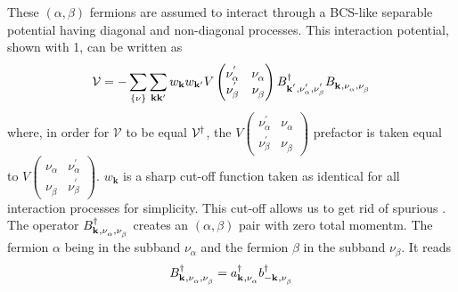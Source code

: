 \documentclass[11pt]{article} %
\begin{document}
These $(\alpha,\beta)$ fermions are assumed to interact through a BCS-like separable potential having diagonal and non-diagonal processes.  This interaction potential, shown with 1, can be written as 
\begin{equation}\label{eq:V}
\mathcal{V}=-\sum_{\{\nu\}}\sum_{\mathbf{k}\mathbf{k}'}w_{\mathbf{k}}w_{\mathbf{k}'}V 
\begin{pmatrix}
\nu_{\alpha}^{'}&\nu_{\alpha}^{}\\
\nu_{\beta}^{'}&\nu_{\beta}^{}
\end{pmatrix}
B^{\dagger}_{\mathbf{k}^{'},\nu_{\alpha}^{'},\nu_{\beta}^{'}}
B^{}_{\mathbf{k}^{ },\nu_{\alpha}^{},\nu_{\beta}^{}}
\end{equation}
where, in order for $\mathcal{V}$ to be equal  $\mathcal{V}^{\dagger}$, the $V 
\left(\begin{smallmatrix}
\nu_{\alpha}^{'}&\nu_{\alpha}^{}\\
\nu_{\beta}^{'}&\nu_{\beta}^{}
\end{smallmatrix}\right)$ prefactor is taken equal to $V 
\left(\begin{smallmatrix}
\nu_{\alpha}^{}&\nu_{\alpha}^{'}\\
\nu_{\beta}^{}&\nu_{\beta}^{'}
\end{smallmatrix}\right)$. 
$w_{\mathbf{k}}$ is a sharp cut-off function taken as identical for all interaction processes for simplicity. This cut-off allows us to get rid of spurious .  The operator   $B^{\dagger}_{\mathbf{k}^{ },\nu_{\alpha}^{},\nu_{\beta}^{}}$ creates an $(\alpha,\beta)$ pair with zero total momentm. The fermion $\alpha$ being in the subband $\nu_{\alpha}$ and the fermion $\beta$ in the subband $\nu_{\beta}$.  It reads 
\begin{equation}
B^{\dagger}_{\mathbf{k}^{ },\nu_{\alpha}^{},\nu_{\beta}^{}}=a^{\dagger}_{\mathbf{k}^{ },\nu_{\alpha}^{}}
b^{\dagger}_{-\mathbf{k}^{ },\nu_{\beta}^{}}
\end{equation}
\end{document}
